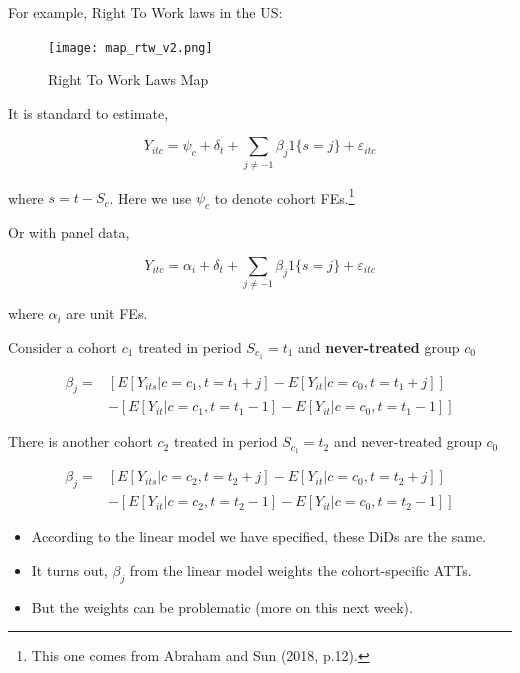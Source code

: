 \documentclass[
  letterpaper,
  DIV=11,
  numbers=noendperiod]{scrreprt}
\providecommand{\tightlist}{%
  \setlength{\itemsep}{0pt}\setlength{\parskip}{0pt}}\usepackage{longtable,booktabs,array}
\theoremstyle{definition}
\theoremstyle{remark}
\begin{document}
For example, Right To Work laws in the US:

\begin{figure}

{\centering \texttt{[image: map\_rtw\_v2.png]}

}

\caption{Right To Work Laws Map}

\end{figure}

It is standard to estimate,

\[
Y_{itc} = \psi_c + \delta_t + \sum_{j\neq-1}\beta_j 1\{s=j\} + \varepsilon_{itc}
\]

where \(s=t-S_c\). Here we use \(\psi_c\) to denote cohort
FEs.\footnote{This one comes from Abraham and Sun (2018, p.12).}

Or with panel data,

\[
Y_{itc} = \alpha_i + \delta_t + \sum_{j\neq-1}\beta_j 1\{s=j\} + \varepsilon_{itc}
\]

where \(\alpha_i\) are unit FEs.

Consider a cohort \(c_1\) treated in period \(S_{c_1} = t_1\) and
\textbf{never-treated} group \(c_0\)

\[
\begin{align*}
\beta_j=&\left[E[Y_{its}|c=c_1,t = t_1 + j] - E[Y_{it}|c=c_0,t = t_1+j]\right] \\
&-\left[E[Y_{it}|c=c_1,t = t_1 - 1] - E[Y_{it}|c=c_0,t = t_1 -1]\right]
\end{align*}
\]

There is another cohort \(c_2\) treated in period \(S_{c_1} = t_2\) and
never-treated group \(c_0\)

\[
\begin{align*}
\beta_j=&\left[E[Y_{its}|c=c_2,t = t_2 + j] - E[Y_{it}|c=c_0,t = t_2+j]\right] \\
&-\left[E[Y_{it}|c=c_2,t = t_2 - 1] - E[Y_{it}|c=c_0,t = t_2 -1]\right]
\end{align*}
\]

\begin{itemize}
\tightlist
\item
  According to the linear model we have specified, these DiDs are the
  same.
\item
  It turns out, \(\beta_j\) from the linear model weights the
  cohort-specific ATTs.
\item
  But the weights can be problematic (more on this next week).
\end{itemize}
\end{document}
